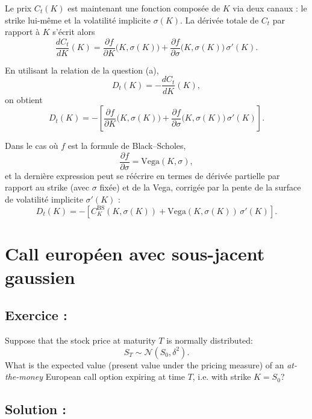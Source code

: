 Le prix $C_t(K)$ est maintenant une fonction composée de $K$ via deux canaux :
le strike lui-même et la volatilité implicite $\sigma(K)$. La dérivée totale de $C_t$
par rapport à $K$ s'écrit alors
\[
\frac{d C_t}{d K}(K)
= \frac{\partial f}{\partial K}\big(K, \sigma(K)\big)
  + \frac{\partial f}{\partial \sigma}\big(K, \sigma(K)\big)\, \sigma'(K).
\]

En utilisant la relation de la question (a),
\[
D_t(K) = - \frac{d C_t}{d K}(K),
\]
on obtient
\[
\boxed{
D_t(K)
= -\left[
\frac{\partial f}{\partial K}\big(K, \sigma(K)\big)
+ \frac{\partial f}{\partial \sigma}\big(K, \sigma(K)\big)\, \sigma'(K)
\right].
}
\]

Dans le cas où $f$ est la formule de Black--Scholes,
\[
\frac{\partial f}{\partial \sigma} = \text{Vega}(K,\sigma) ,
\]
et la dernière expression peut se réécrire en termes de dérivée partielle par rapport
au strike (avec $\sigma$ fixée) et de la Vega, corrigée par la pente de la surface
de volatilité implicite $\sigma'(K)$ :
\[
D_t(K) = -\left[ C_K^{\text{BS}}(K,\sigma(K)) + \text{Vega}(K,\sigma(K))\, \sigma'(K) \right].
\]


\section{Call européen avec sous-jacent gaussien}

\subsection*{Exercice :}

\begin{exerciseBox}
Suppose that the stock price at maturity \(T\) is normally distributed:
\[
S_T \sim \mathcal{N}(S_0,\delta^2).
\]
What is the expected value (present value under the pricing measure) of an \emph{at-the-money} European call option expiring at time \(T\), i.e. with strike \(K=S_0\)?
\end{exerciseBox}



\subsection*{Solution :}

